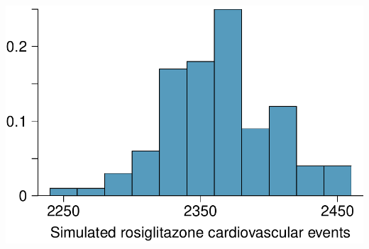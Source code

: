 {\begin{minipage}[c]{0.5\textwidth}
\includegraphics[width = \textwidth]{ch_summarizing_data/figures/eoce/randomization_avandia/randomization_avandia.pdf} \\
\end{minipage}
}{}


